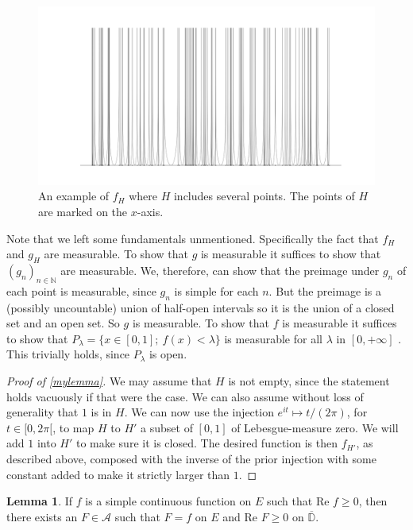 \documentclass[a4paper,12pt,twoside,BCOR=10mm]{scrbook}
\theoremstyle{definition}
\theoremstyle{definition}
\newtheorem{lemma}[theorem]{Lemma}
\theoremstyle{definition}
\renewcommand{\Re}{\text{Re }}
\begin{document}
\begin{figure}[h]
\centering
\includegraphics[width=1\textwidth]{graph101}
\caption{An example of $f_H$ where $H$ includes several points. The points of $H$ are marked on the $x$-axis. }
\end{figure}
Note that we left some fundamentals unmentioned.
Specifically the fact that $f_H$ and $g_H$ are measurable.
To show that $g$ is measurable it suffices to show that $(g_n)_{n \in \mathbb{N}}$ are measurable.
We, therefore, can show that the preimage under $g_n$ of each point is measurable, since $g_n$ is simple for each $n$.
But the preimage is a (possibly uncountable) union of half-open intervals so it is the union of a closed set and an open set.
So $g$ is measurable.
To show that $f$ is measurable it suffices to show that $P_{\lambda} = \{x \in [0, 1];\ f(x) < \lambda\}$ is measurable for all $\lambda$ in $[0, +\infty]$ \citep[lemma $1.3.9$]{tao}.
This trivially holds, since $P_{\lambda}$ is open.
\begin{proof}[Proof of \ref{mylemma}]
We may assume that $H$ is not empty, since the statement holds vacuously if that were the case.
We can also assume without loss of generality that $1$ is in $H$.
We can now use the injection $e^{it} \mapsto t/(2\pi)$, for $t \in [0, 2\pi[$,  to map $H$ to $H'$ a subset of $[0, 1]$ of Lebesgue-measure zero.
We will add $1$ into $H'$ to make sure it is closed.
The desired function is then $f_{H'}$, as described above, composed with the inverse of the prior injection with some constant added to make it strictly larger than $1$.
\end{proof}
\begin{lemma}
\label{rudinlemma1}
If $f$ is a simple continuous function on $E$ such that $\Re f \geq 0$, then there exists an $F \in \mathcal{A}$ such that $F = f$ on $E$ and $\Re F \geq 0$ on $\overline{\mathbb{D}}$.
\end{lemma}
\end{document}
